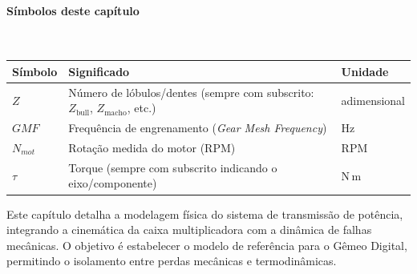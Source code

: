 \documentclass[12pt,a4paper]{article}
\numberwithin{equation}{section}
\numberwithin{table}{section}
\numberwithin{figure}{section}
\begin{document}
\paragraph{Símbolos deste capítulo}\mbox{}\\[-0.5em]
{\small
\begin{longtable}{>{\raggedright\arraybackslash}p{2.6cm} >{\raggedright\arraybackslash}p{9.2cm} >{\raggedright\arraybackslash}p{2.6cm}}
	\toprule
	\textbf{Símbolo} & \textbf{Significado} & \textbf{Unidade} \\ \midrule
	\endhead
	$Z$ & Número de lóbulos/dentes (sempre com subscrito: $Z_{\text{bull}}$, $Z_{\text{macho}}$, etc.) & adimensional \\
	$GMF$ & Frequência de engrenamento (\textit{Gear Mesh Frequency}) & Hz \\
	$N_{mot}$\dag & Rotação medida do motor (RPM) & RPM \\
	$\tau$ & Torque (sempre com subscrito indicando o eixo/componente) & N\,m \\
	\bottomrule
\end{longtable}
}




	
	Este capítulo detalha a modelagem física do sistema de transmissão de potência, integrando a cinemática da caixa multiplicadora com a dinâmica de falhas mecânicas. O objetivo é estabelecer o modelo de referência para o Gêmeo Digital, permitindo o isolamento entre perdas mecânicas e termodinâmicas.
	
\end{document}
